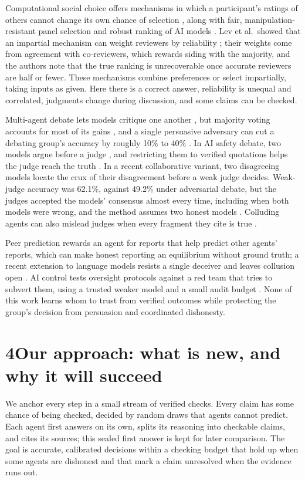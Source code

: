 \documentclass[11pt,letterpaper]{article}
\begin{document}
Computational social choice offers mechanisms in which a participant's ratings of others cannot change its own chance of selection \cite{kurokawa2015impartial,alon2011sum}, along with fair, manipulation-resistant panel selection \cite{flanigan2021fair,flanigan2024manipulation} and robust ranking of AI models \cite{khalaf2026maximal}. Lev et al.\ showed that an impartial mechanism can weight reviewers by reliability \cite{lev2023peernomination}; their weights come from agreement with co-reviewers, which rewards siding with the majority, and the authors note that the true ranking is unrecoverable once accurate reviewers are half or fewer. These mechanisms combine preferences or select impartially, taking inputs as given. Here there is a correct answer, reliability is unequal and correlated, judgments change during discussion, and some claims can be checked.

Multi-agent debate lets models critique one another \cite{du2024debate}, but majority voting accounts for most of its gains \cite{choi2025debate}, and a single persuasive adversary can cut a debating group's accuracy by roughly 10\% to 40\% \cite{amayuelas2024attack}. In AI safety debate, two models argue before a judge \cite{irving2018debate}, and restricting them to verified quotations helps the judge reach the truth \cite{khan2024debating}. In a recent collaborative variant, two disagreeing models locate the crux of their disagreement before a weak judge decides. Weak-judge accuracy was 62.1\%, against 49.2\% under adversarial debate, but the judges accepted the models' consensus almost every time, including when both models were wrong, and the method assumes two honest models \cite{jiang2026disagreement}. Colluding agents can also mislead judges when every fragment they cite is true \cite{hu2026lying}.

Peer prediction rewards an agent for reports that help predict other agents' reports, which can make honest reporting an equilibrium without ground truth; a recent extension to language models resists a single deceiver and leaves collusion open \cite{qiu2026truthfulness}. AI control tests oversight protocols against a red team that tries to subvert them, using a trusted weaker model and a small audit budget \cite{greenblatt2024control}. None of this work learns whom to trust from verified outcomes while protecting the group's decision from persuasion and coordinated dishonesty.

\section*{4\quad Our approach: what is new, and why it will succeed}
We anchor every step in a small stream of verified checks. Every claim has some chance of being checked, decided by random draws that agents cannot predict. Each agent first answers on its own, splits its reasoning into checkable claims, and cites its sources; this sealed first answer is kept for later comparison. The goal is accurate, calibrated decisions within a checking budget that hold up when some agents are dishonest and that mark a claim unresolved when the evidence runs out.
\end{document}
